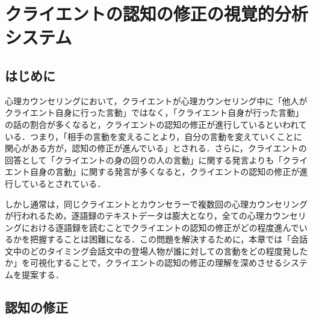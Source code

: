 \documentclass[shuuron]{kuee}
\begin{document}
\chapter{クライエントの認知の修正の視覚的分析システム}

\section{はじめに}
心理カウンセリングにおいて，クライエントが心理カウンセリング中に「他人がクライエント自身に行った言動」ではなく，「クライエント自身が行った言動」の話の割合が多くなると，クライエントの認知の修正が進行しているといわれている．つまり，「相手の言動を変えることより，自分の言動を変えていくことに関心がある方が，認知の修正が進んでいる」\cite{zokad}とされる．さらに，クライエントの回答として「クライエントの身の回りの人の言動」に関する発言よりも「クライエント自身の言動」に関する発言が多くなると，クライエントの認知の修正が進行しているとされている．

しかし通常は，同じクライエントとカウンセラーで複数回の心理カウンセリングが行われるため，逐語録のテキストデータは膨大となり，全ての心理カウンセリングにおける逐語録を読むことでクライエントの認知の修正がどの程度進んでいるかを把握することは困難になる．この問題を解決するために，本章では「会話文中のどのタイミング会話文中の登場人物が誰に対しての言動をどの程度発したか」を可視化することで，クライエントの認知の修正の理解を深めさせるシステムを提案する．



\section{認知の修正}%
\end{document}
